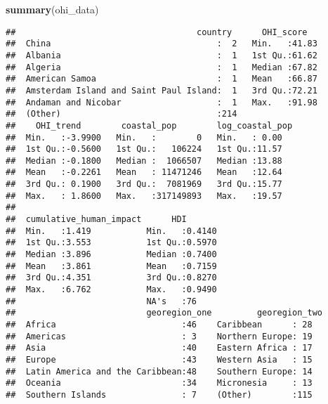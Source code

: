 \documentclass[]{article}
\newenvironment{Shaded}{\begin{snugshade}}{\end{snugshade}}
\newcommand{\KeywordTok}[1]{\textcolor[rgb]{0.13,0.29,0.53}{\textbf{#1}}}
\newcommand{\NormalTok}[1]{#1}
\newcommand{\OperatorTok}[1]{\textcolor[rgb]{0.81,0.36,0.00}{\textbf{#1}}}
\begin{document}
\begin{Shaded}
\begin{Highlighting}[]
\KeywordTok{summary}\NormalTok{(ohi_data)}
\end{Highlighting}
\end{Shaded}

\begin{verbatim}
##                                    country      OHI_score    
##  China                                 :  2   Min.   :41.83  
##  Albania                               :  1   1st Qu.:61.62  
##  Algeria                               :  1   Median :67.82  
##  American Samoa                        :  1   Mean   :66.87  
##  Amsterdam Island and Saint Paul Island:  1   3rd Qu.:72.21  
##  Andaman and Nicobar                   :  1   Max.   :91.98  
##  (Other)                               :214                  
##    OHI_trend        coastal_pop        log_coastal_pop
##  Min.   :-3.9900   Min.   :        0   Min.   : 0.00  
##  1st Qu.:-0.5600   1st Qu.:   106224   1st Qu.:11.57  
##  Median :-0.1800   Median :  1066507   Median :13.88  
##  Mean   :-0.2261   Mean   : 11471246   Mean   :12.64  
##  3rd Qu.: 0.1900   3rd Qu.:  7081969   3rd Qu.:15.77  
##  Max.   : 1.8600   Max.   :317149893   Max.   :19.57  
##                                                       
##  cumulative_human_impact      HDI        
##  Min.   :1.419           Min.   :0.4140  
##  1st Qu.:3.553           1st Qu.:0.5970  
##  Median :3.896           Median :0.7400  
##  Mean   :3.861           Mean   :0.7159  
##  3rd Qu.:4.351           3rd Qu.:0.8270  
##  Max.   :6.762           Max.   :0.9490  
##                          NA's   :76      
##                          georegion_one         georegion_two
##  Africa                         :46    Caribbean      : 28  
##  Americas                       : 3    Northern Europe: 19  
##  Asia                           :40    Eastern Africa : 17  
##  Europe                         :43    Western Asia   : 15  
##  Latin America and the Caribbean:48    Southern Europe: 14  
##  Oceania                        :34    Micronesia     : 13  
##  Southern Islands               : 7    (Other)        :115
\end{verbatim}

\begin{Shaded}
\end{Shaded}
\end{document}
